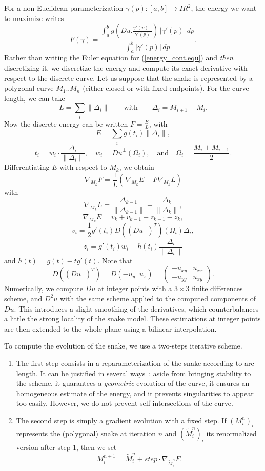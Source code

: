 For a non-Euclidean
parameterization $\gamma(p):[a,b]\to I\!\!R^2$, the energy we want to
maximize writes
\begin{equation}
F(\gamma) = \frac{\int_a^b g\left(Du.\frac{\gamma'(p)^\perp}{|\gamma'(p)|}\right) \,|\gamma'(p)|\, dp}
{\int_a^b |\gamma'(p)|\, dp}.
\label{energy_cont.equ}
\end{equation}
Rather than writing the Euler equation for (\ref{energy_cont.equ})
and {\it then} discretizing it, we discretize the energy and
compute its exact derivative with respect to the discrete curve.
Let us suppose that the snake is represented by a polygonal curve
$M_1..M_n$ (either closed or with fixed endpoints). For the curve
length, we can take
$$L = \sum_i \|\Delta_i\|\qquad\mathrm{with}\qquad \Delta_i=M_{i+1}-M_i.$$
Now the discrete energy can be written $F = \frac EL$,
with
$$E=\sum_i g(t_i)\|\Delta_i\|,$$
$$t_i = w_i \cdot \frac{\Delta_i}{\|\Delta_i\|},\quad
w_i = {D u}^{\bot}(\Omega_i),\quad \mathrm{and}\quad \Omega_i =
\frac{M_i+M_{i+1}}2.$$ Differentiating $E$ with respect to $M_k$,
we obtain
$$\nabla_{M_k} F = \frac 1L \left( \frac{}{}\!\!
\nabla_{M_k} E- F\nabla_{M_k} L\right)$$
with
$$\nabla_{M_k} L= \frac{\Delta_{k-1}}{\|\Delta_{k-1}\|}
- \frac{\Delta_k}{\|\Delta_k\|},$$
$$\nabla_{M_k} E= v_k+v_{k-1}+z_{k-1}-z_k,$$
$$v_i = \frac 12
g'(t_i)D(({D u}^{\bot})^T)(\Omega_i) \Delta_i,$$
$$z_i = g'(t_i) w_i +h(t_i)\frac{\Delta_i}{\|\Delta_i\|}$$
and $h(t)=g(t)-tg'(t)$. Note that
$$D(({D u}^{\bot})^T)
= D ( -u_y\;\; u_x) = \left(\begin{array}{cc}
-u_{xy} & u_{xx} \\
-u_{yy} & u_{xy}
\end{array}\right).$$
Numerically, we compute $Du$ at integer points
with a $3\times 3$ finite differences scheme,
and $D^2 u$ with the same scheme applied to the computed components of
$Du$. This introduces a slight smoothing of the derivatives, which
counterbalances a little the strong locality of the snake model.
These estimations at integer points are then extended to the whole
plane using a bilinear interpolation.

\medskip

To compute the evolution of the snake, we use a two-steps iterative
scheme.
\begin{enumerate}
\item The first step consists in a reparameterization of the snake
according to arc length. It can be justified in several ways~:
aside from bringing stability to the scheme, it guarantees a {\it
geometric} evolution of the curve, it ensures an homogeneous
estimate of the energy, and it prevents singularities to appear
too easily. However, we do not prevent self-intersections of the
curve.
\item The second step is simply a gradient evolution with a fixed step.
If $(M_i^n)_i$ represents the (polygonal) snake at iteration $n$ and
$(\tilde M_i^n)_i$ its renormalized version after step 1, then we set
$$M_i^{n+1} = \tilde M_i^n + step \cdot  \nabla_{\tilde M_i^n} F.$$
\end{enumerate}

